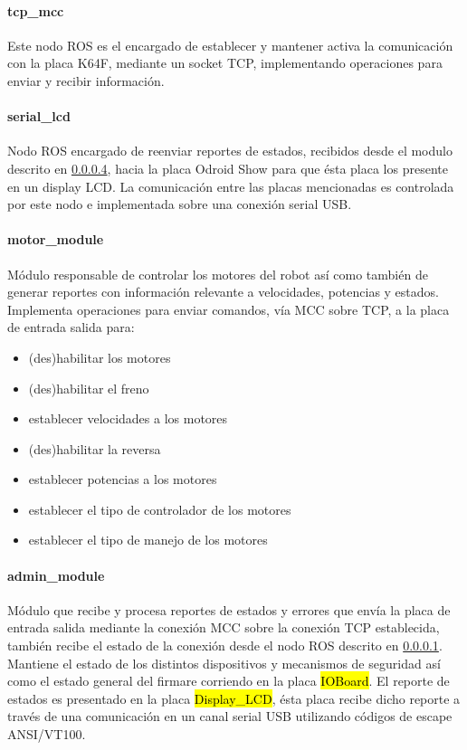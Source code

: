 \documentclass[withindex,glossary]{cam-thesis}
\begin{document}
\paragraph{tcp\_mcc} \label{sec:Sol Prop :: tcp_mcc}
Este nodo ROS es el encargado de establecer y mantener activa la comunicación con la placa K64F, mediante un socket TCP, implementando operaciones para enviar y recibir información.

\paragraph{serial\_lcd}
Nodo ROS encargado de reenviar reportes de estados, recibidos desde el modulo descrito en \ref{sec:Sol Prop :: admin_module}, hacia la placa Odroid Show para que ésta placa los presente en un display LCD. La comunicación entre las placas mencionadas es controlada por este nodo e implementada sobre una conexión serial USB.

\paragraph{motor\_module}
Módulo responsable de controlar los motores del robot así como también  de generar reportes con información relevante a velocidades, potencias y estados. Implementa operaciones para enviar comandos, vía MCC sobre TCP, a la placa de entrada salida para:
\begin{itemize}
	\item (des)habilitar los motores	
	\item (des)habilitar el freno	
	\item establecer velocidades a los motores
	\item (des)habilitar la reversa
	\item establecer potencias a los motores
	\item establecer el tipo de controlador de los motores
	\item establecer el tipo de manejo de los motores
\end{itemize}

\paragraph{admin\_module} \label{sec:Sol Prop :: admin_module}
Módulo que recibe y procesa reportes de estados y errores que envía la placa de entrada salida mediante la conexión MCC sobre la conexión TCP establecida, también recibe el estado de la conexión desde el nodo ROS descrito en \ref{sec:Sol Prop :: tcp_mcc}. Mantiene el estado de los distintos dispositivos y mecanismos de seguridad así como el estado general del firmare corriendo en la placa \hl{IOBoard}. El reporte de estados es presentado en la placa \hl{Display\_LCD}, ésta placa recibe dicho reporte a través de una comunicación en un canal serial USB utilizando códigos de escape ANSI/VT100.
\end{document}
